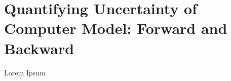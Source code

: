 \chapter[Introduction]{Quantifying Uncertainty of Computer Model: Forward and Backward}\label{ch:introduction}

Lorem Ipsum








